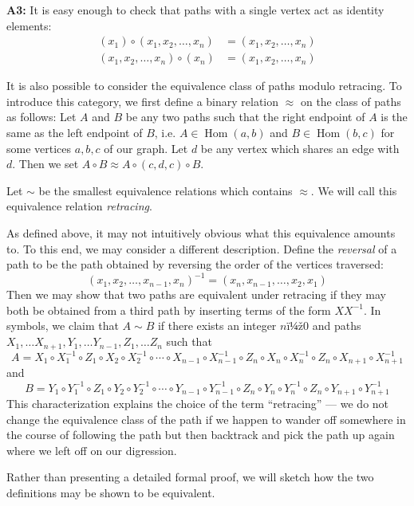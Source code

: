 \documentclass[12pt]{article}
\begin{document}
\textbf{A3:}  It is easy enough to check that paths with a single
vertex act as identity elements:
\begin{align*}
(x_1) \circ (x_1, x_2, \ldots, x_n) &= (x_1, x_2, \ldots, x_n) \\
(x_1, x_2, \ldots, x_n) \circ (x_n) &= (x_1, x_2, \ldots, x_n)
\end{align*}

It is also possible to consider the equivalence class of paths 
modulo retracing.  To introduce this category, we first define
a binary relation $\approx$ on the class of paths as follows:
Let $A$ and $B$ be any two paths such that the right endpoint 
of $A$ is the same as the left endpoint of $B$, i.e. $A \in 
\operatorname{Hom}(a,b)$ and $B \in \operatorname{Hom}(b,c)$
for some vertices $a,b,c$ of our graph.  Let $d$ be any vertex 
which shares an edge with $d$.  Then we set $A \circ B \approx
A \circ (c, d, c) \circ B$.

Let $\sim$ be the smallest equivalence relations which contains
$\approx$.  We will call this equivalence relation \emph{retracing}.

As defined above, it may not intuitively obvious what this 
equivalence amounts to.  To this end, we may consider a different
description.  Define the \emph{reversal} of a path to be the
path obtained by reversing the order of the vertices traversed:
\[
 (x_1, x_2, \ldots, x_{n-1}, x_n) ^{-1} = 
 (x_n, x_{n-1}, \ldots, x_2, x_1)
\]
Then we may show that two paths are equivalent under retracing
if they may both be obtained from a third path by inserting
terms of the form $XX^{-1}$.  In symbols, we claim that $A \sim B$
if there exists an integer $nï¼ž0$ and paths $X_1, \ldots X_{n+1}, 
Y_1, \ldots Y_{n-1}, Z_1, \ldots Z_n$ such that 
\[
 A = X_1 \circ X_1^{-1} \circ Z_1 \circ X_2 \circ X_2^{-1} \circ 
 \cdots \circ X_{n-1} \circ X_{n-1}^{-1} \circ Z_n \circ X_n \circ
 X_n^{-1} \circ Z_n \circ X_{n+1} \circ X_{n+1}^{-1}
\]
and
\[
 B = Y_1 \circ Y_1^{-1} \circ Z_1 \circ Y_2 \circ Y_2^{-1} \circ 
 \cdots \circ Y_{n-1} \circ Y_{n-1}^{-1} \circ Z_n \circ Y_n \circ
 Y_n^{-1} \circ Z_n \circ Y_{n+1} \circ Y_{n+1}^{-1}
\]
This characterization explains the choice of the term ``retracing'' ---
we do not change the equivalence class of the path if we happen to 
wander off somewhere in the course of following the path but then
backtrack and pick the path up again where we left off on our
digression.

Rather than presenting a detailed formal proof, we will sketch how
the two definitions may be shown to be equivalent.
\end{document}
